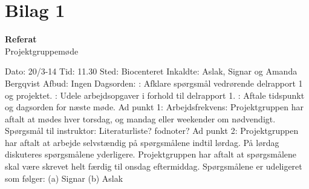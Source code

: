 \documentclass[a4paper,12pt]{article}
\begin{document}
\section{Bilag 1}
\begin{center}
\huge{\bf{Referat}}
\\
\normalsize{Projektgruppemøde}
\end{center}
Dato: 20/3-14
\newline
\newline
Tid: 11.30
\newline
\newline
Sted: Biocenteret
\newline
\newline
Inkaldte: Aslak, Signar og Amanda Bergqvist
\newline
\newline
Afbud: Ingen
\newline
\newline
\newline
\newline
Dagsorden:
\newline
{}: Afklare spørgsmål vedrørende delrapport 1 og projektet.
\newline
{}: Udele arbejdsopgaver i forhold til delrapport 1.
\newline
{}: Aftale tidspunkt og dagsorden for næste møde.
\newline
\newline
\newline
\newline
Ad punkt 1:
Arbejdsfrekvens: Projektgruppen har aftalt at mødes hver torsdag, og mandag eller weekender om nødvendigt. 
\newline
\newline
Spørgsmål til instruktor: Literaturliste? fodnoter?
\newline
\newline
Ad punkt 2: Projektgruppen har aftalt at arbejde selvstændig på spørgsmålene indtil lørdag. På lørdag diskuteres spørgsmålene yderligere. Projektgruppen har aftalt at spørgsmålene skal være skrevet helt færdig til onsdag eftermiddag. 
Spørgsmålene er udeligeret som følger:   
\newline
\newline
(a) Signar 
\newline
\newline
(b) Aslak
\newline
\end{document}
